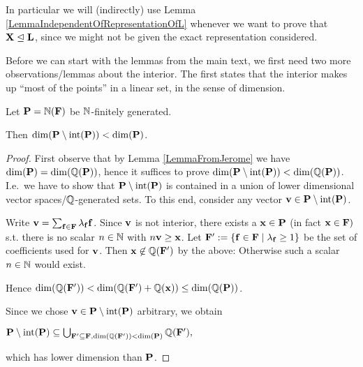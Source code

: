In particular we will (indirectly) use Lemma \ref{LemmaIndependentOfRepresentationOfL} whenever we want to prove that \(\mathbf{X} \trianglelefteq \mathbf{L}\), since we might not be given the exact representation considered.

Before we can start with the lemmas from the main text, we first need two more observations/lemmas about the interior. The first states that the interior makes up ``most of the points'' in a linear set, in the sense of dimension.

\begin{lemma}\label{LemmaBoundaryLowerDimension}
Let \(\mathbf{P}=\mathbb{N}(\mathbf{F})\) be \(\mathbb{N}\)-finitely generated.

Then \(\dim(\mathbf{P} \setminus \operatorname{int}(\mathbf{P})) < \dim(\mathbf{P})\).
\end{lemma}

\begin{proof}
First observe that by Lemma \ref{LemmaFromJerome} we have \(\dim(\mathbf{P})=\dim(\mathbb{Q}(\mathbf{P}))\), hence it suffices to prove \(\dim(\mathbf{P} \setminus \operatorname{int}(\mathbf{P})) < \dim(\mathbb{Q}(\mathbf{P}))\). I.e.\ we have to show that \(\mathbf{P} \setminus \operatorname{int}(\mathbf{P})\) is contained in a union of lower dimensional vector spaces/\(\mathbb{Q}\)-generated sets. To this end, consider any vector \(\mathbf{v} \in \mathbf{P} \setminus \operatorname{int}(\mathbf{P})\). 

Write \(\mathbf{v}=\sum_{\mathbf{f} \in \mathbf{F}} \lambda_{\mathbf{f}} \mathbf{f}\). Since \(\mathbf{v}\) is not interior, there exists a \(\mathbf{x} \in \mathbf{P}\) (in fact \(\mathbf{x} \in \mathbf{F})\) s.t. there is no scalar \(n \in \mathbb{N}\) with \(n \mathbf{v} \geq \mathbf{x}\). Let \(\mathbf{F}':=\{\mathbf{f} \in \mathbf{F} \mid \lambda_{\mathbf{f}} \geq 1\}\) be the set of coefficients used for \(\mathbf{v}\). Then \(\mathbf{x} \not \in \mathbb{Q}(\mathbf{F}')\) by the above: Otherwise such a scalar \(n \in \mathbb{N}\) would exist. 

Hence \(\dim(\mathbb{Q}(\mathbf{F}'))<\dim(\mathbb{Q}(\mathbf{F}')+\mathbb{Q}(\mathbf{x}))\leq \dim(\mathbb{Q}(\mathbf{P}))\). 

Since we chose \(\mathbf{v} \in \mathbf{P} \setminus \operatorname{int}(\mathbf{P})\) arbitrary, we obtain 

\(\mathbf{P} \setminus \operatorname{int}(\mathbf{P}) \subseteq \bigcup_{\mathbf{F}' \subseteq \mathbf{F}, \dim(\mathbb{Q}(\mathbf{F}'))<\dim(\mathbf{P})} \mathbb{Q}(\mathbf{F}'),\)

which has lower dimension than \(\mathbf{P}\).
\end{proof}

